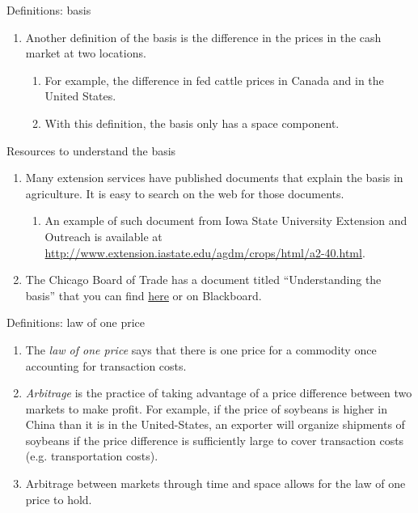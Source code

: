 \documentclass[table,xcolor=pdftex,dvipsnames]{beamer}\usepackage[]{graphicx}\usepackage[]{color}
\begin{document}

\begin{frame}{Definitions: basis}
\begin{enumerate}[label=\textbullet]
  \item Another definition of the basis is the difference in the prices in the cash market at two locations.
        \begin{enumerate}[label=-]
          \item For example, the difference in fed cattle prices in Canada and in the United States.
          \item With this definition, the basis only has a space component.
       \end{enumerate}
\end{enumerate}
\end{frame}


\begin{frame}{Resources to understand the basis}
\begin{enumerate}[label=\textbullet]
  \item Many extension services have published documents that explain the basis in agriculture. It is easy to search on the web for those documents.
      \begin{enumerate}[label=-]
          \item  An example of such document from Iowa State University Extension and Outreach is available at \url{http://www.extension.iastate.edu/agdm/crops/html/a2-40.html}.
       \end{enumerate}
  \item The Chicago Board of Trade has a document titled ``Understanding the basis'' that you can find \href{http://www.gofutures.com/pdfs/Understanding-Basis.pdf}{here} or on Blackboard.
\end{enumerate}
\end{frame}


\begin{frame}{Definitions: law of one price}
\begin{enumerate}[label=\textbullet]
    \item The \emph{law of one price} says that there is one price for a commodity once accounting for transaction costs.
    \item \emph{Arbitrage} is the practice of taking advantage of a price difference between two markets to make profit. For example, if the price of soybeans is higher in China than it is in the United-States, an exporter will organize shipments of soybeans if the price difference is sufficiently large to cover transaction costs (e.g. transportation costs).
    \item Arbitrage between markets through time and space allows for the law of one price to hold.
\end{enumerate}
\end{frame}
\end{document}
